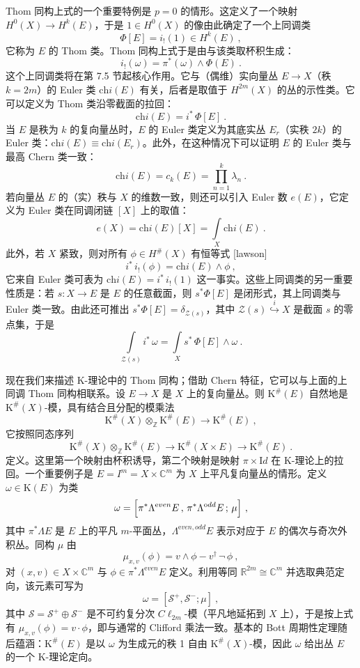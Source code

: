 \documentclass[11pt,a4paper]{ctexart}
\begin{document}
Thom 同构上式的一个重要特例是 \(p=0\) 的情形。这定义了一个映射 \(H^0(X)\rightarrow H^k(E)\)，于是 \(1\in H^0(X)\) 的像由此确定了一个上同调类 \[\Phi[E]=i_!(1)\in H^k(E)\ ,\] 它称为 \(E\) 的 Thom 类。Thom 同构上式于是由与该类取杯积生成： \[i_!(\omega)=\pi^*(\omega)\wedge\Phi(E)\ .\] 这个上同调类将在第 7.5 节起核心作用。它与（偶维）实向量丛 \(E\rightarrow X\)（秩 \(k=2m\)）的 Euler 类 \(\mathrm{ch}i(E)\) 有关，后者是取值于 \(H^{2m}(X)\) 的丛的示性类。它可以定义为 Thom 类沿零截面的拉回： \[\mathrm{ch}i(E)=i^*\,\Phi[E]\ .\] 当 \(E\) 是秩为 \(k\) 的复向量丛时，\(E\) 的 Euler 类定义为其底实丛 \(E_r\)（实秩 \(2k\)）的 Euler 类：\(\mathrm{ch}i(E)\equiv \mathrm{ch}i(E_r)\)。此外，在这种情况下可以证明 \(E\) 的 Euler 类与最高 Chern 类一致： \[\mathrm{ch}i(E)=c_k(E)=\prod_{n=1}^k\lambda_n\ .\] 若向量丛 \(E\) 的（实）秩与 \(X\) 的维数一致，则还可以引入 Euler 数 \(e(E)\)，它定义为 Euler 类在同调闭链 \([X]\) 上的取值： \[e(X)=\mathrm{ch}i(E)[X]=\int\limits_X\mathrm{ch}i(E)\ .\] 此外，若 \(X\) 紧致，则对所有 \(\phi\in H^\#(X)\) 有恒等式 [lawson] \[i^*\,i_!(\phi)=\mathrm{ch}i(E)\wedge\phi\ ,\] 它来自 Euler 类可表为 \(\mathrm{ch}i(E)=i^*\,i_!(1)\) 这一事实。这些上同调类的另一重要性质是：若 \(s:X\to E\) 是 \(E\) 的任意截面，则 \(s^*\Phi[E]\) 是闭形式，其上同调类与 Euler 类一致。由此还可推出 \(s^*\Phi[E]=\delta_{{\mathcal Z}(s)}\)，其中 \({\mathcal Z}(s)\stackrel{i}{\hookrightarrow}X\) 是截面 \(s\) 的零点集，于是 \[\int\limits_{{\mathcal
    Z}(s)}i^*\,\omega=\int\limits_Xs^*\,\Phi[E]\wedge\omega\ .\]

现在我们来描述 K-理论中的 Thom 同构；借助 Chern 特征，它可以与上面的上同调 Thom 同构相联系。设 \(E\rightarrow X\) 是 \(X\) 上的复向量丛。则 \({\mathrm K}^\#(E)\) 自然地是 \({\mathrm K}^\#(X)\)-模，具有结合且分配的模乘法 \[{\mathrm K}^\#(X)\otimes_{\mathbb{Z}}{\mathrm K}^\#(E)\longrightarrow {\mathrm K}^\#(E)\ ,\] 它按照同态序列 \[{\mathrm K}^\#(X)\otimes_{\mathbb{Z}}{\mathrm K}^\#(E)\longrightarrow{\mathrm K}^\#(X\times E)\longrightarrow
{\mathrm K}^\#(E)\ .\] 定义。这里第一个映射由杯积诱导，第二个映射是映射 \(\pi\times {\mathrm Id}\) 在 K-理论上的拉回。一个重要例子是 \(E=I^m=X\times{\mathbb{C}}^m\) 为 \(X\) 上平凡复向量丛的情形。定义 \(\omega\in{\mathrm K}(E)\) 为类 \[\omega=
\Bigl[\pi^*\Lambda^{\mathrm even}E\,,\,\pi^*\Lambda^{\mathrm odd}E\,;\,\mu\Bigr]\ ,\] 其中 \(\pi^*\Lambda E\) 是 \(E\) 上的平凡 \(m\)-平面丛，\(\Lambda^{\mathrm even,odd}E\) 表示对应于 \(E\) 的偶次与奇次外积丛。同构 \(\mu\) 由 \[\mu_{x,v}(\phi)=v\wedge\phi-v^\dagger\,\neg\,\phi\ ,\] 对 \((x,v)\in X\times{\mathbb{C}}^m\) 与 \(\phi\in\pi^*\Lambda^{\mathrm even}E\) 定义。利用等同 \({\mathbb{R}}^{2m}\cong{\mathbb{C}}^m\) 并选取典范定向，该元素可写为 \[\omega=[{\mathcal S}^+,{\mathcal S}^-;\mu]\ ,\] 其中 \({\mathcal S}={\mathcal S}^+\oplus{\mathcal S}^-\) 是不可约复分次 \(C\ell_{2m}\)-模（平凡地延拓到 \(X\) 上），于是按上式有 \(\mu_{x,v}(\phi)=v\cdot\phi\)，即与通常的 Clifford 乘法一致。基本的 Bott 周期性定理随后蕴涵：\({\mathrm K}^\#(E)\) 是以 \(\omega\) 为生成元的秩 1 自由 \({\mathrm K}^\#(X)\)-模，因此 \(\omega\) 给出丛 \(E\) 的一个 K-理论定向。
\end{document}
